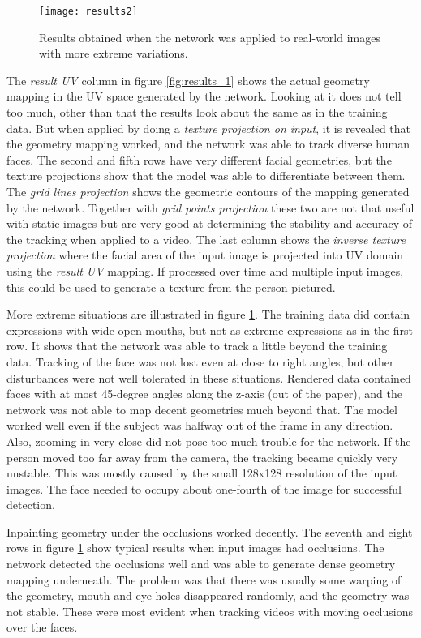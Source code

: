 \begin{figure}[p]
    \texttt{[image: results2]}
    \caption[More real image results]{Results obtained when the network was applied to real-world images with more extreme variations.}
    \label{fig:results_2}
\end{figure}

The \textit{result UV} column in figure \ref{fig:results_1} shows the actual geometry mapping in the UV space generated by the network. Looking at it does not tell too much, other than that the results look about the same as in the training data. But when applied by doing a \textit{texture projection on input}, it is revealed that the geometry mapping worked, and the network was able to track diverse human faces. The second and fifth rows have very different facial geometries, but the texture projections show that the model was able to differentiate between them. The \textit{grid lines projection} shows the geometric contours of the mapping generated by the network. Together with \textit{grid points projection} these two are not that useful with static images but are very good at determining the stability and accuracy of the tracking when applied to a video. The last column shows the \textit{inverse texture projection} where the facial area of the input image is projected into UV domain using the \textit{result UV} mapping. If processed over time and multiple input images, this could be used to generate a texture from the person pictured.

More extreme situations are illustrated in figure \ref{fig:results_2}. The training data did contain expressions with wide open mouths, but not as extreme expressions as in the first row. It shows that the network was able to track a little beyond the training data. Tracking of the face was not lost even at close to right angles, but other disturbances were not well tolerated in these situations. Rendered data contained faces with at most 45-degree angles along the z-axis (out of the paper), and the network was not able to map decent geometries much beyond that. The model worked well even if the subject was halfway out of the frame in any direction. Also, zooming in very close did not pose too much trouble for the network. If the person moved too far away from the camera, the tracking became quickly very unstable. This was mostly caused by the small 128x128 resolution of the input images. The face needed to occupy about one-fourth of the image for successful detection.

Inpainting geometry under the occlusions worked decently. The seventh and eight rows in figure \ref{fig:results_2} show typical results when input images had occlusions. The network detected the occlusions well and was able to generate dense geometry mapping underneath. The problem was that there was usually some warping of the geometry, mouth and eye holes disappeared randomly, and the geometry was not stable. These were most evident when tracking videos with moving occlusions over the faces.

